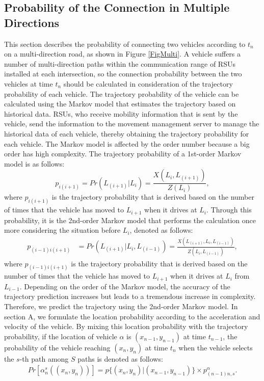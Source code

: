 \documentclass[electronics,aricle,accept,pdftex,moreauthors]{Definitions/mdpi}
\begin{document}
\subsection{Probability of the Connection in Multiple Directions} \label{sec.op2}

This section describes the probability of connecting two vehicles according to $t_{n}$ on a multi-direction road, as shown in Figure \ref{FigMulti}.
A vehicle suffers a number of multi-direction paths within the communication range of RSUs installed at each intersection, so the connection probability between the two vehicles at time $t_{n}$ should be calculated in consideration of the trajectory probability of each vehicle.
The trajectory probability of the vehicle can be calculated using the Markov model that estimates the trajectory based on historical data.
RSUs, who receive mobility information that is sent by the vehicle, send the information to the movement management server to manage the historical data of each vehicle, thereby obtaining the trajectory probability for each vehicle.
The Markov model is affected by the order number because a big order has high complexity.
The trajectory probability of a 1st-order Markov model is as follows:
\begin{equation}
    {p}_{i(i+1)}=Pr(L_{(i+1)}|L_i)=\frac{X(L_i,L_{(i+1)})}{Z(L_i)},
\end{equation}
where ${p}_{i(i+1)}$ is the trajectory probability that is derived based on the number of times that the vehicle has moved to $L_{i+1}$ when it drives at $L_{i}$.
Through this probability, it is the 2nd-order Markov model that performs the calculation once more considering the situation before $L_{i}$, denoted as follows:
\begin{equation} \begin{split}
    {p}_{(i-1)i(i+1)}&=Pr(L_{(i+1)}|L_i,L_{(i-1)})=\frac{X(L_{(i+1)},L_i,L_{(i-1)})}{Z(L_i, L_{(i-1)})},
\end{split} \end{equation}
where ${p}_{(i-1)i(i+1)}$ is the trajectory probability that is derived based on the number of times that the vehicle has moved to $L_{i+1}$ when it drives at $L_{i}$ from $L_{i-1}$.
Depending on the order of the Markov model, the accuracy of the trajectory prediction increases but leads to a tremendous increase in complexity.
Therefore, we predict the trajectory using the 2nd-order Markov model.
In section A, we formulate the location probability according to the acceleration and velocity of the vehicle.
By mixing this location probability with the trajectory probability, if the location of vehicle $\alpha$ is $(x_{n-1}, y_{n-1})$ at time $t_{n-1}$, the probability of the vehicle reaching $(x_{n}, y_{n})$ at time $t_{n}$ when the vehicle selects the $s$-th path among $S$ paths is denoted as follows: 
\begin{equation}
    \begin{split}
        Pr[\alpha^{s}_{n}((x_{n},y_{n}))]=p\{(x_{n}, y_{n})\vert (x_{n-1}, y_{n-1})\} \times p^{\alpha}_{(n-1)n, s}.
    \end{split}
\end{equation}
\end{document}
